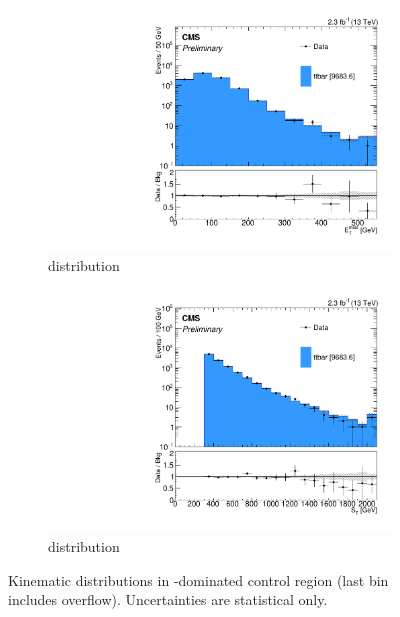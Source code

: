 \begin{figure}
\begin{center}
	\begin{subfigure}[b]{.7\textwidth}
		\includegraphics[width=\textwidth]{Background/bkg_tt/ttbar_MET_STgt300_afterWeights}
		\caption{\MET distribution}
	\end{subfigure}
	\begin{subfigure}[b]{.7\textwidth}
		\includegraphics[width=\textwidth]{Background/bkg_tt/ttbar_ST_STgt300_afterWeights}
		\caption{\ST distribution}
	\end{subfigure}
	\caption{Kinematic distributions in \ttbar-dominated control region (last bin includes overflow). Uncertainties are statistical only.
	\label{fig:tt2}}
\end{center}
\end{figure}

